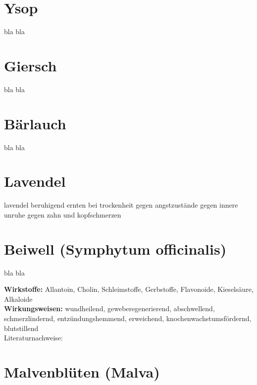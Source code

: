 \section{Ysop}
\label{   }

bla bla


\section{Giersch}
\label{   }

bla bla


\section{Bärlauch}
\label{   }

bla bla


\section{Lavendel}
\label{   }

lavendel	
beruhigend
ernten bei trockenheit
gegen angstzustände
gegen innere unruhe
gegen zahn und kopfschmerzen

\section{Beiwell (Symphytum officinalis)}
\label{   }

bla bla

\textbf{Wirkstoffe:} Allantoin, Cholin, Schleimstoffe, Gerbstoffe, Flavonoide, Kieselsäure, Alkaloide\\

\textbf{Wirkungsweisen:} wundheilend, geweberegenerierend, abschwellend, schmerzlindernd, entzündungshemmend, erweichend, knochenwachstumsfördernd, blutstillend \\

Literaturnachweise: \cite{nedoma2018heilsalben}


\section{Malvenblüten (Malva)}
\label{   }


